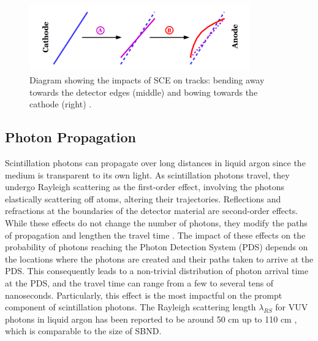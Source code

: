 \begin{figure}[htbp] 
\centering    
\includegraphics[width=0.85\textwidth]{SCE}
\caption[Impacts of Space Charge Effects on Tracks]{
Diagram showing the impacts of SCE on tracks: bending away towards the detector edges (middle) and bowing towards the cathode (right) \cite{SCE}.
}
\label{fig:SCE}
\end{figure}


\subsection{Photon Propagation}
\label{sec:photonprop}


Scintillation photons can propagate over long distances in liquid argon since the medium is transparent to its own light.
As scintillation photons travel, they undergo Rayleigh scattering as the first-order effect, involving the photons elastically scattering off atoms, altering their trajectories. 
Reflections and refractions at the boundaries of the detector material are second-order effects. 
While these effects do not change the number of photons, they modify the paths of propagation and lengthen the travel time \cite{sbnd_pds_paper}. 
The impact of these effects on the probability of photons reaching the Photon Detection System (PDS) depends on the locations where the photons are created and their paths taken to arrive at the PDS. 
This consequently leads to a non-trivial distribution of photon arrival time at the PDS, and the travel time can range from a few to several tens of nanoseconds.
Particularly, this effect is the most impactful on the prompt component of scintillation photons.
The Rayleigh scattering length $\lambda_{RS}$ for VUV photons in liquid argon has been reported to be around 50 cm \cite{rayleigh50} up to 110 cm \cite{rayleigh110}, which is comparable to the size of SBND.

